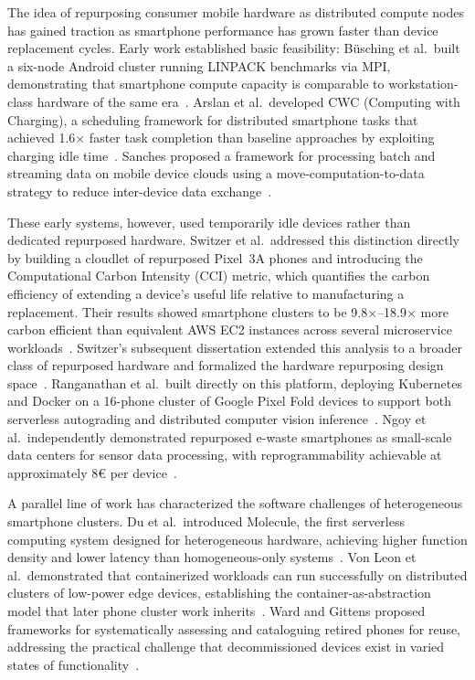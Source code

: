 \documentclass[acmlarge]{acmart}
\begin{document}
The idea of repurposing consumer mobile hardware as distributed compute
nodes has gained traction as smartphone performance has grown faster
than device replacement cycles. Early work established basic
feasibility: Büsching et al.\ built a six-node Android cluster running
LINPACK benchmarks via MPI, demonstrating that smartphone compute
capacity is comparable to workstation-class hardware of the same
era~\cite{busching2012droidcluster}. Arslan et al.\ developed CWC
(Computing with Charging), a scheduling framework for distributed
smartphone tasks that achieved 1.6$\times$ faster task completion than
baseline approaches by exploiting charging idle time~\cite{arslan2015cwc}.
Sanches proposed a framework for processing batch and streaming data on
mobile device clouds using a move-computation-to-data strategy to
reduce inter-device data exchange~\cite{sanches2017distributed}.
 
These early systems, however, used temporarily idle devices rather than
dedicated repurposed hardware. Switzer et al.\ addressed this
distinction directly by building a cloudlet of repurposed Pixel~3A
phones and introducing the Computational Carbon Intensity (CCI) metric,
which quantifies the carbon efficiency of extending a device's useful
life relative to manufacturing a replacement. Their results showed
smartphone clusters to be 9.8$\times$--18.9$\times$ more carbon
efficient than equivalent AWS EC2 instances across several
microservice workloads~\cite{10.1145/3575693.3575710}. Switzer's
subsequent dissertation extended this analysis to a broader class of
repurposed hardware and formalized the hardware repurposing design
space~\cite{switzer2025hardware}. Ranganathan et al.\ built directly on
this platform, deploying Kubernetes and Docker on a 16-phone cluster of
Google Pixel Fold devices to support both serverless autograding and
distributed computer vision inference~\cite{ranganathan2025junkyard}.
Ngoy et al.\ independently demonstrated repurposed e-waste smartphones
as small-scale data centers for sensor data processing, with
reprogrammability achievable at approximately 8\euro{} per
device~\cite{ngoy2025ewaste}.
 
A parallel line of work has characterized the software challenges of
heterogeneous smartphone clusters. Du et al.\ introduced Molecule, the
first serverless computing system designed for heterogeneous hardware,
achieving higher function density and lower latency than
homogeneous-only systems~\cite{du2022molecule}. Von Leon et al.\
demonstrated that containerized workloads can run successfully on
distributed clusters of low-power edge devices, establishing the
container-as-abstraction model that later phone cluster work
inherits~\cite{vonleon2018container}. Ward and Gittens proposed
frameworks for systematically assessing and cataloguing retired phones
for reuse, addressing the practical challenge that decommissioned
devices exist in varied states of functionality~\cite{ward2018repurposing}.
 
\end{document}
